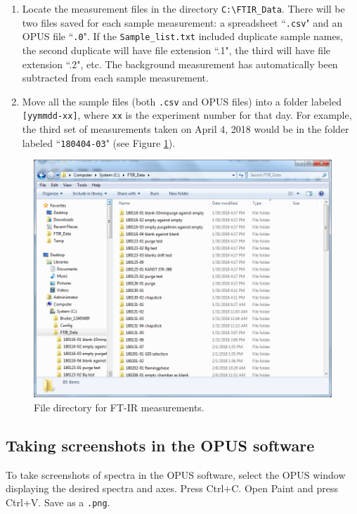 \begin{enumerate}
    \item Locate the measurement files in the directory \verb|C:\FTIR_Data|. There will be two files saved for each sample measurement: a spreadsheet ``\verb|.csv|" and an OPUS file ``\verb|.0|". If the \verb|Sample_list.txt| included duplicate sample names, the second duplicate will have file extension ``.1", the third will have file extension ``.2", etc. The background measurement has automatically been subtracted from each sample measurement.
    \item Move all the sample files (both \verb|.csv| and OPUS files) into a folder labeled \verb|[yymmdd-xx]|, where \verb|xx| is the experiment number for that day. For example, the third set of measurements taken on April 4, 2018 would be in the folder labeled ``\verb|180404-03|" (see Figure \ref{screenshotfiles}).
\end{enumerate}

\begin{figure}[htb]
\begin{center}
\includegraphics[width=6.5in]{data.PNG}
\caption{File directory for FT-IR measurements.}
\label{screenshotfiles}
\end{center}
\end{figure}

\subsection{Taking screenshots in the OPUS software}
To take screenshots of spectra in the OPUS software, select the OPUS window displaying the desired spectra and axes. Press Ctrl+C. Open Paint and press Ctrl+V. Save as a \verb|.png|.

